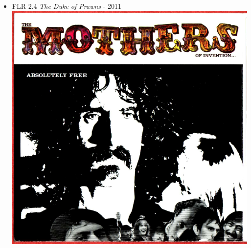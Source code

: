 \documentclass[]{article}
\begin{document}
\begin{itemize}
\item
  FLR 2.4 \emph{The Duke of Prawns} - 2011
  \hfill\includegraphics[keepaspectratio, height=0.15\textheight]{graphics/flr24.png}
\end{itemize}

\section{}\label{section}
\end{document}
